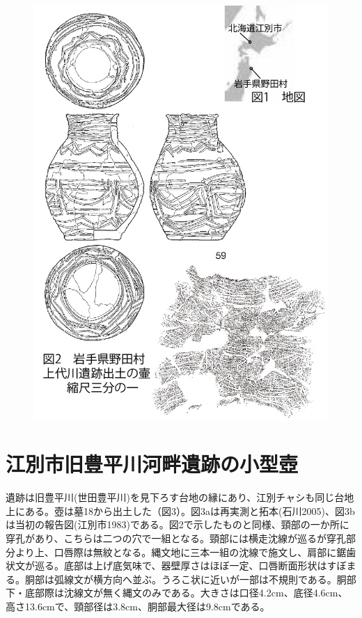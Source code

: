 \documentclass[a4j,11pt,twocolumn,openany]{jsbook}
\begin{document}
\begin{figure}[ht]
	\centering
	\includegraphics[width=\linewidth]{fig/03_Otaishi/01_otaishi.jpg}
	\label{}
	\vspace{-2\baselineskip}
\end{figure}

\section{江別市旧豊平川河畔遺跡の小型壺}
遺跡は旧豊平川(世田豊平川)を見下ろす台地の縁にあり、江別チャシも同じ台地上にある。壺は墓18から出土した（図3）。図3aは再実測と拓本(石川2005)、図3bは当初の報告図(江別市1983)である。図2で示したものと同様、頸部の一か所に穿孔があり、こちらは二つの穴で一組となる。頸部には横走沈線が巡るが穿孔部分より上、口唇際は無紋となる。縄文地に三本一組の沈線で施文し、肩部に鋸歯状文が巡る。底部は上げ底気味で、器壁厚さはほぼ一定、口唇断面形状はすぼまる。胴部は弧線文が横方向へ並ぶ。うろこ状に近いが一部は不規則である。胴部下・底部際は沈線文が無く縄文のみである。大きさは口径4.2cm、底径4.6cm、高さ13.6cmで、頸部径は3.8cm、胴部最大径は9.8cmである。
\end{document}
